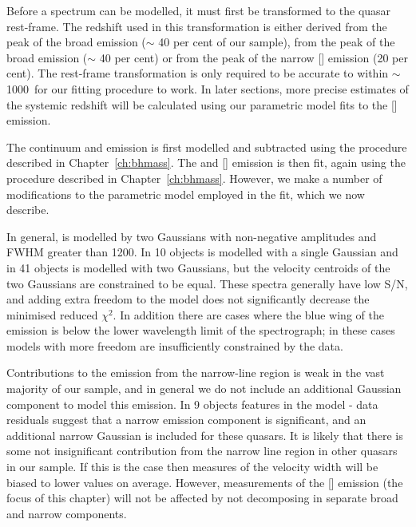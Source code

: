 Before a spectrum can be modelled, it must first be transformed to the quasar rest-frame.  
The redshift used in this transformation is either derived from the peak of the broad \ha emission ($\sim$ 40 per cent of our sample), from the peak of the broad \hb emission ($\sim$ 40 per cent) or from the peak of the narrow [] emission (20 per cent).
The rest-frame transformation is only required to be accurate to within $\sim$1000\kms\, for our fitting procedure to work. 
In later sections, more precise estimates of the systemic redshift will be calculated using our parametric model fits to the [] emission. 

The continuum and  emission is first modelled and subtracted using the procedure described in Chapter~\ref{ch:bhmass}. 
The \hb and [] emission is then fit, again using the procedure described in Chapter~\ref{ch:bhmass}. 
However, we make a number of modifications to the parametric model employed in the fit, which we now describe. 

In general, \hb is modelled by two Gaussians with non-negative amplitudes and \ac{FWHM} greater than 1200\kms.
In 10 objects \hb is modelled with a single Gaussian and in 41 objects \hb is modelled with two Gaussians, but the velocity centroids of the two Gaussians are constrained to be equal. 
These spectra generally have low \ac{S/N}, and adding extra freedom to the model does not significantly decrease the minimised reduced $\chi^2$.
In addition there are cases where the blue wing of the \hb emission is below the lower wavelength limit of the spectrograph; in these cases models with more freedom are insufficiently constrained by the data.    

Contributions to the \hb emission from the narrow-line region is weak in the vast majority of our sample, and in general we do not include an additional Gaussian component to model this emission. 
In 9 objects features in the model - data residuals suggest that a narrow emission component is significant, and an additional narrow Gaussian is included for these quasars. 
It is likely that there is some not insignificant contribution from the narrow line region in other quasars in our sample. 
If this is the case then measures of the \hb velocity width will be biased to lower values on average. 
However, measurements of the [] emission (the focus of this chapter) will not be affected by not decomposing \hb in separate broad and narrow components.  

